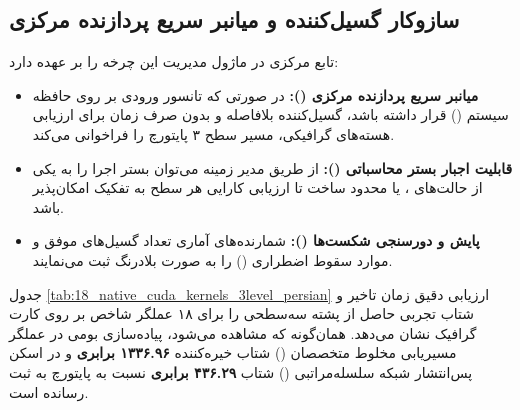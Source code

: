 \documentclass[12pt,a4paper]{report}
\theoremstyle{definition}
\begin{document}
\subsection{سازوکار گسیل‌کننده و میانبر سریع پردازنده مرکزی}
تابع مرکزی  در ماژول  مدیریت این چرخه را بر عهده دارد:
\begin{itemize}
    \item \textbf{میانبر سریع پردازنده مرکزی ():} در صورتی که تانسور ورودی بر روی حافظه سیستم () قرار داشته باشد، گسیل‌کننده بلافاصله و بدون صرف زمان برای ارزیابی هسته‌های گرافیکی، مسیر سطح ۳ پایتورچ را فراخوانی می‌کند.
    \item \textbf{قابلیت اجبار بستر محاسباتی ():} از طریق مدیر زمینه  می‌توان بستر اجرا را به یکی از حالت‌های ،  یا  محدود ساخت تا ارزیابی کارایی هر سطح به تفکیک امکان‌پذیر باشد.
    \item \textbf{پایش و دورسنجی شکست‌ها ():} شمارنده‌های آماری  تعداد گسیل‌های موفق و موارد سقوط اضطراری () را به صورت بلادرنگ ثبت می‌نمایند.
\end{itemize}

جدول \ref{tab:18_native_cuda_kernels_3level_persian} ارزیابی دقیق زمان تاخیر و شتاب تجربی حاصل از پشته سه‌سطحی را برای ۱۸ عملگر شاخص بر روی کارت گرافیک  نشان می‌دهد. همان‌گونه که مشاهده می‌شود، پیاده‌سازی بومی  در عملگر مسیریابی مخلوط متخصصان () شتاب خیره‌کننده \textbf{۱۳۳۶.۹۶ برابری} و در اسکن پس‌انتشار شبکه سلسله‌مراتبی () شتاب \textbf{۴۳۶.۲۹ برابری} نسبت به پایتورچ به ثبت رسانده است.
\end{document}
